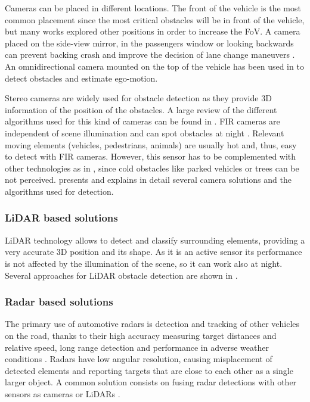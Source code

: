 Cameras can be placed in different locations. The front of the vehicle is 
the most common placement since the most critical obstacles will be in front of 
the vehicle, but many works explored other positions in order to increase the
FoV. 
A camera placed on the side-view mirror, in the 
passengers window \cite{chang2008real} or looking backwards \cite{suhr2019rearview}
can prevent backing crash and
improve the decision of lane change maneuvers \cite{alonso2008lane, 
song2007lateral, blanc2007larasidecam}. 
An omnidirectional camera mounted
on the top of the vehicle has been used in \cite{gandhi2006vehicle}
to detect obstacles and estimate ego-motion.

Stereo cameras are widely used for obstacle detection as they provide 3D 
information of the position of the obstacles. A large review of the different 
algorithms used for this kind of cameras can be found in \cite{bernini2014real}.
FIR cameras are independent of scene illumination and can spot obstacles at
night \cite{olmeda2013pedestrian}. Relevant moving elements (vehicles, 
pedestrians, animals) are usually hot and, thus, easy to detect with FIR 
cameras. However, this sensor has to be complemented with other technologies
as in \cite{krotosky2007color}, since cold obstacles like parked vehicles or
trees can be not perceived.
\cite{sivaraman2013looking} presents and explains in detail several camera
solutions and the algorithms used for detection.

\subsubsection{LiDAR based solutions}
LiDAR technology allows to detect and classify surrounding elements, providing
a very accurate 3D position and its shape. 
As it is an active sensor its performance is not affected by the illumination 
of the scene, so it can work also at night. Several approaches for LiDAR 
obstacle detection are shown in \cite{li2016vehicle}.

\subsubsection{Radar based solutions}
The primary use of automotive radars is detection and tracking of other 
vehicles on the road, thanks to their high accuracy measuring target 
distances and relative speed, long range detection and performance in adverse 
weather conditions \cite{blanc2004obstacle}. 
Radars have low angular resolution, causing misplacement of detected elements 
and reporting targets that are close to each other as a single larger object.
A common solution consists on fusing radar detections with other sensors as 
cameras \cite{garcia2012data} or LiDARs \cite{gohring2011radar}.

